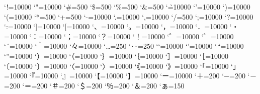 \prebreakpenalty`!=10000
\prebreakpenalty`"=10000
\postbreakpenalty`\#=500
\postbreakpenalty`\$=500
\prebreakpenalty`\%=500
\prebreakpenalty`\&=500
\postbreakpenalty`\`=10000
\prebreakpenalty`'=10000
\prebreakpenalty`)=10000
\postbreakpenalty`(=10000
\prebreakpenalty`*=500
\prebreakpenalty`+=500
\prebreakpenalty`-=10000
\prebreakpenalty`.=10000
\prebreakpenalty`,=10000
\prebreakpenalty`/=500
\prebreakpenalty`;=10000
\prebreakpenalty`?=10000
\prebreakpenalty`:=10000
\prebreakpenalty`]=10000
\postbreakpenalty`[=10000
\prebreakpenalty`、=10000
\prebreakpenalty`。=10000
\prebreakpenalty`，=10000
\prebreakpenalty`．=10000
\prebreakpenalty`・=10000
\prebreakpenalty`：=10000
\prebreakpenalty`；=10000
\prebreakpenalty`？=10000
\prebreakpenalty`！=10000
\prebreakpenalty`゛=10000%
\prebreakpenalty`゜=10000%
\prebreakpenalty`´=10000%
\postbreakpenalty`｀=10000%
\prebreakpenalty`々=10000%
\prebreakpenalty`…=250%
\prebreakpenalty`‥=250%
\postbreakpenalty`‘=10000%
\prebreakpenalty`’=10000%
\postbreakpenalty`“=10000%
\prebreakpenalty`”=10000%
\prebreakpenalty`）=10000
\postbreakpenalty`（=10000
\prebreakpenalty`｝=10000
\postbreakpenalty`｛=10000
\prebreakpenalty`］=10000
\postbreakpenalty`［=10000
\postbreakpenalty`〔=10000%
\prebreakpenalty`〕=10000%
\postbreakpenalty`〈=10000%
\prebreakpenalty`〉=10000%
\postbreakpenalty`《=10000%
\prebreakpenalty`》=10000%
\postbreakpenalty`「=10000%
\prebreakpenalty`」=10000%
\postbreakpenalty`『=10000%
\prebreakpenalty`』=10000%
\postbreakpenalty`【=10000%
\prebreakpenalty`】=10000%
\prebreakpenalty`ー=10000
\prebreakpenalty`＋=200
\prebreakpenalty`−=200%
\prebreakpenalty`－=200%
\prebreakpenalty`＝=200
\postbreakpenalty`＃=200
\postbreakpenalty`＄=200
\prebreakpenalty`％=200
\prebreakpenalty`＆=200
\prebreakpenalty`ぁ=150
